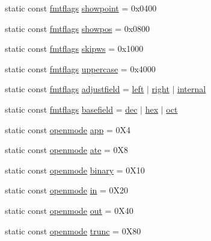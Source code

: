 \begin{DoxyCompactItemize}
\item 
static const \hyperlink{classios__base_a975a829c0b5d999dd5bce3758b59da10}{fmtflags} \hyperlink{classios__base_a67e83af7da73436945ac77741e67a14f}{showpoint} = 0x0400
\item 
static const \hyperlink{classios__base_a975a829c0b5d999dd5bce3758b59da10}{fmtflags} \hyperlink{classios__base_a1d8cc21b958994159e17e0ff8d06e615}{showpos} = 0x0800
\item 
static const \hyperlink{classios__base_a975a829c0b5d999dd5bce3758b59da10}{fmtflags} \hyperlink{classios__base_a49e9a402efc1522af1ee3af7595559a4}{skipws} = 0x1000
\item 
static const \hyperlink{classios__base_a975a829c0b5d999dd5bce3758b59da10}{fmtflags} \hyperlink{classios__base_a6e815a500247ed4d6ba2bb43965c47fa}{uppercase} = 0x4000
\item 
static const \hyperlink{classios__base_a975a829c0b5d999dd5bce3758b59da10}{fmtflags} \hyperlink{classios__base_a4beb095a1dc7f3219d75db177f58b688}{adjustfield} = \hyperlink{classios__base_a3ab7a428d219e30dbd4d99d11bbb1a21}{left} $|$ \hyperlink{classios__base_a5192e88a82b9aefc8ae8f6d57ea4a720}{right} $|$ \hyperlink{classios__base_aea76c8967ab6a2be9edeefbdb2118e61}{internal}
\item 
static const \hyperlink{classios__base_a975a829c0b5d999dd5bce3758b59da10}{fmtflags} \hyperlink{classios__base_a099df6dd825e552ca96669dd1be390c1}{basefield} = \hyperlink{classios__base_abb926294fefec12bd2215df50443d3ec}{dec} $|$ \hyperlink{classios__base_a14a0660d3467c093faf74d3876dccd78}{hex} $|$ \hyperlink{classios__base_a5448c9726ac797a737f548645317206f}{oct}
\item 
static const \hyperlink{classios__base_a97a503456f60758f2c110f99b0ce0815}{openmode} \hyperlink{classios__base_a64d9d8299325373c7033d9712e25d02c}{app} = 0\-X4
\item 
static const \hyperlink{classios__base_a97a503456f60758f2c110f99b0ce0815}{openmode} \hyperlink{classios__base_a237edbe1dd49e5495b99c0aadb6ae2a7}{ate} = 0\-X8
\item 
static const \hyperlink{classios__base_a97a503456f60758f2c110f99b0ce0815}{openmode} \hyperlink{classios__base_a5ebf69777b28b9c9fb3c4dbb42bf4159}{binary} = 0\-X10
\item 
static const \hyperlink{classios__base_a97a503456f60758f2c110f99b0ce0815}{openmode} \hyperlink{classios__base_a371ab336bfce00a620526ba26f9be813}{in} = 0\-X20
\item 
static const \hyperlink{classios__base_a97a503456f60758f2c110f99b0ce0815}{openmode} \hyperlink{classios__base_a5300f1b3e0fe12cc7c484ab89f8bba83}{out} = 0\-X40
\item 
static const \hyperlink{classios__base_a97a503456f60758f2c110f99b0ce0815}{openmode} \hyperlink{classios__base_a19dcd0116327467d34feaa1a15733e4c}{trunc} = 0\-X80
\end{DoxyCompactItemize}
